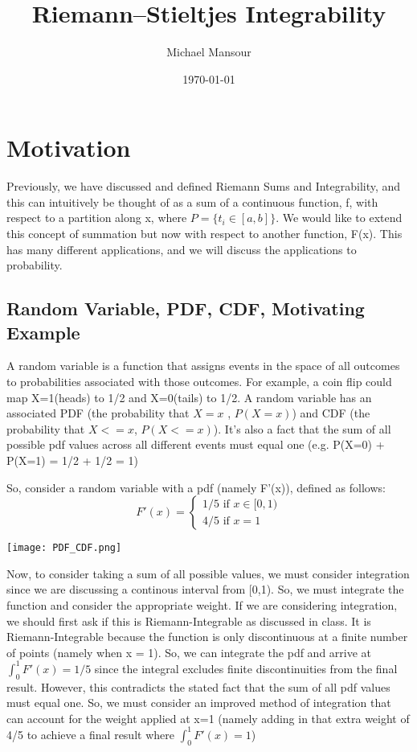 \documentclass{report}
\title{Riemann–Stieltjes Integrability}
\author{Michael Mansour}
\date{\today}
\begin{document}
\maketitle

\section{Motivation}
Previously, we have discussed and defined Riemann Sums and Integrability, 
and this can intuitively be thought of as a sum of a continuous function, 
f, with respect to a partition along x, where $P = \{t_i  \in [a,b]\}$. We would like to extend 
this concept of summation but now with respect to another function, F(x).
This has many different applications, and we will discuss the applications
to probability.
\subsection{Random Variable, PDF, CDF, Motivating Example}
A random variable is a function that assigns events in the space of all outcomes
to probabilities associated with those outcomes. For example, a coin flip could map
X=1(heads) to 1/2 and X=0(tails) to 1/2. A random variable has an associated PDF (the probability 
that $X = x$ , $P(X=x)$) and CDF (the probability that $X <= x$, $P(X <= x)$). It's also a fact that
the sum of all possible pdf values across all different events must equal one (e.g. P(X=0) + 
P(X=1) = 1/2 + 1/2 = 1)

So, consider a random variable with a pdf (namely F'(x)), defined as follows:
\[
    F'(x) = 
    \begin{cases}
        1/5 \text{ if } x \in [0,1) \\
        4/5 \text{ if } x = 1
    \end{cases}
\]

\begin{center}
    \texttt{[image: PDF\_CDF.png]}
\end{center}

Now, to consider taking a sum of all possible values, we must consider integration
since we are discussing a continous interval from [0,1). So, we must integrate the function
and consider the appropriate weight.
\newline \newline
If we are considering integration, we should first ask if this is Riemann-Integrable
as discussed in class. It is Riemann-Integrable because the function is only discontinuous
at a finite number of points (namely when x = 1). So, we can integrate the pdf and arrive 
at $\int_{0}^{1} F'(x) = 1/5$ since the integral excludes finite discontinuities from the final result. 
However, this contradicts the stated fact that the sum of all pdf values 
must equal one. So, we must consider an improved method of integration that
can account for the weight applied at x=1 (namely adding in that extra weight of 4/5 to achieve
a final result where $\int_{0}^{1} F'(x) = 1$)
\end{document}
